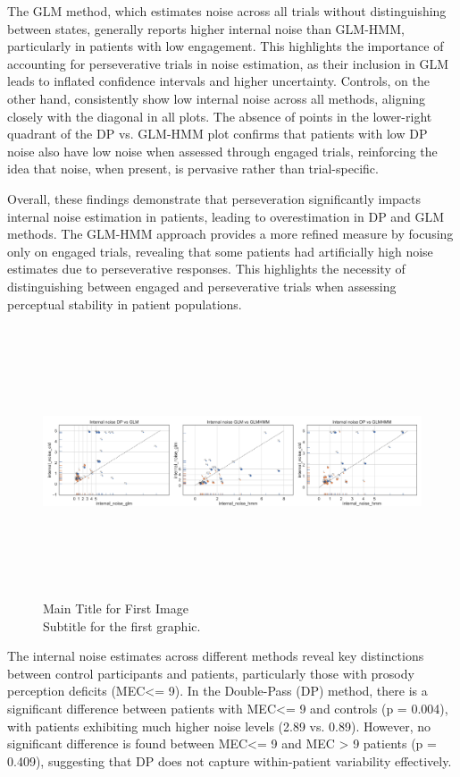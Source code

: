 The GLM method, which estimates noise across all trials without distinguishing between states, generally reports higher internal noise than GLM-HMM, particularly in patients with low engagement. This highlights the importance of accounting for perseverative trials in noise estimation, as their inclusion in GLM leads to inflated confidence intervals and higher uncertainty. Controls, on the other hand, consistently show low internal noise across all methods, aligning closely with the diagonal in all plots. The absence of points in the lower-right quadrant of the DP vs. GLM-HMM plot confirms that patients with low DP noise also have low noise when assessed through engaged trials, reinforcing the idea that noise, when present, is pervasive rather than trial-specific.

Overall, these findings demonstrate that perseveration significantly impacts internal noise estimation in patients, leading to overestimation in DP and GLM methods. The GLM-HMM approach provides a more refined measure by focusing only on engaged trials, revealing that some patients had artificially high noise estimates due to perseverative responses. This highlights the necessity of distinguishing between engaged and perseverative trials when assessing perceptual stability in patient populations.
\begin{figure}[H]
    \centering
    \includegraphics[width=17cm,height=8cm]{MainLayout/Images/chapter8/internal_noise_comparison_glms.jpg}
    \caption{Main Title for First Image \\ \small Subtitle for the first graphic.}
    \label{fig:internal_noise_comparison_glms}
\end{figure}
The internal noise estimates across different methods reveal key distinctions between control participants and patients, particularly those with prosody perception deficits (MEC<= 9). In the Double-Pass (DP) method, there is a significant difference between patients with MEC<= 9 and controls (p = 0.004), with patients exhibiting much higher noise levels (2.89 vs. 0.89). However, no significant difference is found between MEC<= 9 and MEC > 9 patients (p = 0.409), suggesting that DP does not capture within-patient variability effectively.

